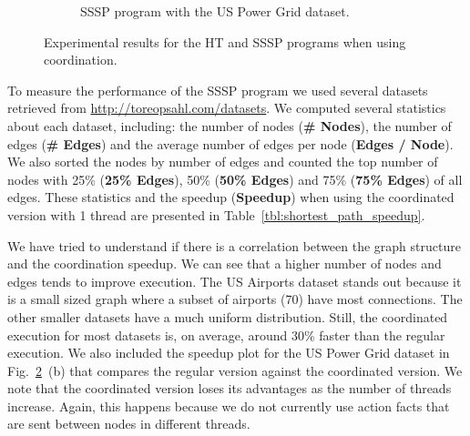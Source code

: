 \begin{figure}[h!]
\begin{subfigure}[b]{0.4\textwidth}
      \caption{SSSP program with the US Power Grid dataset.}\label{exp:sssp-uspowergrid}
   \end{subfigure}
   \caption{Experimental results for the HT and SSSP programs when using coordination.}
\end{figure}

To measure the performance of the SSSP program we used several datasets retrieved from \url{http://toreopsahl.com/datasets}. We computed several
statistics about each dataset, including: the number of nodes (\textbf{\# Nodes}), the number of edges (\textbf{\# Edges}) and
the average number of edges per node (\textbf{Edges / Node}). We also sorted the nodes by number of edges and counted the top number of nodes
with 25\% (\textbf{25\% Edges}), 50\% (\textbf{50\% Edges}) and 75\% (\textbf{75\% Edges}) of all edges.
These statistics and the speedup (\textbf{Speedup}) when using the coordinated version with 1 thread are presented in Table~\ref{tbl:shortest_path_speedup}.

We have tried to understand if there is a correlation between the graph structure and the coordination speedup. We can see that a higher number
of nodes and edges tends to improve execution. The US Airports dataset stands out because it is a small sized graph where a subset of airports
(70) have most connections. The other smaller datasets have a much uniform distribution.
Still, the coordinated execution for most datasets is, on average, around 30\% faster than the regular execution. We also included the speedup plot
for the US Power Grid dataset in Fig.~\ref{exp:sssp-uspowergrid}~(b) that compares the regular version against the coordinated version.
We note that the coordinated version loses its advantages as the number of threads increase. Again, this happens because we do not
currently use action facts that are sent between nodes in different threads.

